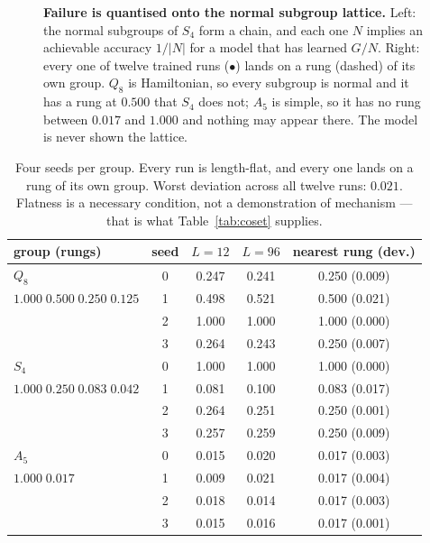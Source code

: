 \documentclass[10pt]{article}
\begin{document}
\begin{figure}[t]
\caption{\textbf{Failure is quantised onto the normal subgroup lattice.} Left: the normal subgroups
of $S_4$ form a chain, and each one $N$ implies an achievable accuracy $1/|N|$ for a model that has
learned $G/N$. Right: every one of twelve trained runs (\textcolor{meas}{$\bullet$}) lands on a rung
(\textcolor{rung}{dashed}) of its own group. $Q_8$ is Hamiltonian, so every subgroup is normal and it
has a rung at $0.500$ that $S_4$ does not; $A_5$ is simple, so it has no rung between $0.017$ and
$1.000$ and nothing may appear there. The model is never shown the lattice.}
\label{fig:lattice}
\end{figure}

\begin{table}[H]\centering\small
\caption{Four seeds per group. Every run is length-flat, and every one lands on a rung of its own
group. Worst deviation across all twelve runs: $0.021$. Flatness is a necessary condition, not a
demonstration of mechanism --- that is what Table~\ref{tab:coset} supplies.}
\begin{tabular}{lcccc}
\toprule
group (rungs) & seed & $L=12$ & $L=96$ & nearest rung (dev.) \\
\midrule
$Q_8$  & 0 & 0.247 & 0.241 & 0.250 (0.009) \\
$1.000\;0.500\;0.250\;0.125$ & 1 & 0.498 & 0.521 & 0.500 (0.021) \\
                             & 2 & 1.000 & 1.000 & 1.000 (0.000) \\
                             & 3 & 0.264 & 0.243 & 0.250 (0.007) \\
\midrule
$S_4$  & 0 & 1.000 & 1.000 & 1.000 (0.000) \\
$1.000\;0.250\;0.083\;0.042$ & 1 & 0.081 & 0.100 & 0.083 (0.017) \\
                             & 2 & 0.264 & 0.251 & 0.250 (0.001) \\
                             & 3 & 0.257 & 0.259 & 0.250 (0.009) \\
\midrule
$A_5$  & 0 & 0.015 & 0.020 & 0.017 (0.003) \\
$1.000\;0.017$               & 1 & 0.009 & 0.021 & 0.017 (0.004) \\
                             & 2 & 0.018 & 0.014 & 0.017 (0.003) \\
                             & 3 & 0.015 & 0.016 & 0.017 (0.001) \\
\bottomrule
\end{tabular}
\label{tab:rungs}
\end{table}
\end{document}
